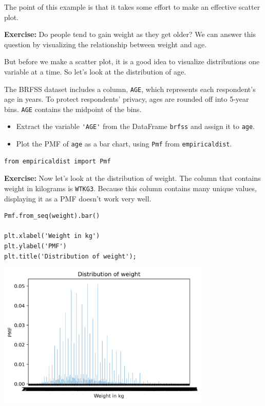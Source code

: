 The point of this example is that it takes some effort to make an
effective scatter plot.

\textbf{Exercise:} Do people tend to gain weight as they get older? We
can answer this question by visualizing the relationship between weight
and age.

But before we make a scatter plot, it is a good idea to visualize
distributions one variable at a time. So let's look at the distribution
of age.

The BRFSS dataset includes a column, \passthrough{\lstinline!AGE!},
which represents each respondent's age in years. To protect respondents'
privacy, ages are rounded off into 5-year bins.
\passthrough{\lstinline!AGE!} contains the midpoint of the bins.

\begin{itemize}
\item
  Extract the variable \passthrough{\lstinline!'AGE'!} from the
  DataFrame \passthrough{\lstinline!brfss!} and assign it to
  \passthrough{\lstinline!age!}.
\item
  Plot the PMF of \passthrough{\lstinline!age!} as a bar chart, using
  \passthrough{\lstinline!Pmf!} from
  \passthrough{\lstinline!empiricaldist!}.
\end{itemize}

\begin{lstlisting}[]
from empiricaldist import Pmf
\end{lstlisting}

\textbf{Exercise:} Now let's look at the distribution of weight. The
column that contains weight in kilograms is
\passthrough{\lstinline!WTKG3!}. Because this column contains many
unique values, displaying it as a PMF doesn't work very well.

\begin{lstlisting}[]
Pmf.from_seq(weight).bar()

plt.xlabel('Weight in kg')
plt.ylabel('PMF')
plt.title('Distribution of weight');
\end{lstlisting}

\begin{center}
\includegraphics[width=4in]{09_relationships_files/09_relationships_34_0.png}
\end{center}

